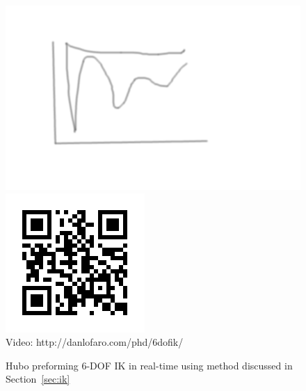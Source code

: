 \begin{figure}[thpb]
  \centering
      \includegraphics[width=0.93\columnwidth]{./pix/tmp.png}
      \includegraphics{./qrcode/qrcode-6dofik.png}\\
      Video: http://danlofaro.com/phd/6dofik/
\caption{Hubo preforming 6-DOF IK in real-time using method discussed in Section~\ref{sec:ik}}
\label{fig:6dofik}
\end{figure}
